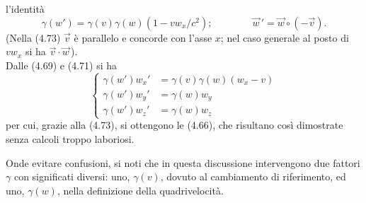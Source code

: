 l'identit\`a
\begin{equation}
  \gamma(w')=\gamma(v)\gamma(w)(1-vw_x/c^2);
  \qquad\qquad\vec w\,'=\vec w\circ(-\vec v).
  \tag{4.73}
\end{equation}
(Nella (4.73) $\vec v$ \`e parallelo e concorde con l'asse $x$; nel caso
generale al posto di $vw_x$ si ha $\vec v\cdot\vec w$\,).\\
Dalle (4.69) e (4.71) si ha
\begin{equation}
  \left\{\begin{aligned}
    \gamma(w')w_x'&=\gamma(v)\gamma(w)(w_x-v)\\
    \gamma(w')w_y'&=\gamma(w)w_y\\
    \gamma(w')w_z'&=\gamma(w)w_z
  \end{aligned}\right.
  \tag{4.74}
\end{equation}
per cui, grazie alla (4.73), si ottengono le (4.66), che risultano cos\`i
dimostrate senza calcoli troppo laboriosi.

Onde evitare confusioni, si noti che in questa discussione intervengono due
fattori $\gamma$ con significati diversi: uno, $\gamma(v)$, dovuto al
cambiamento di riferimento, ed uno, $\gamma(w)$, nella definizione della
quadrivelocit\`a.
